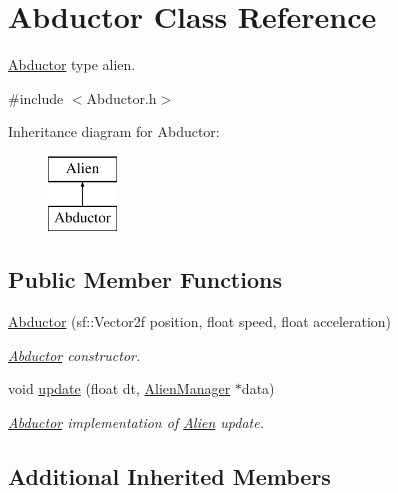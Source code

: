 \hypertarget{class_abductor}{}\section{Abductor Class Reference}
\label{class_abductor}


\hyperlink{class_abductor}{Abductor} type alien.  




{\ttfamily \#include $<$Abductor.\+h$>$}

Inheritance diagram for Abductor\+:\begin{figure}[H]
\begin{center}
\leavevmode
\includegraphics[height=2.000000cm]{class_abductor}
\end{center}
\end{figure}
\subsection*{Public Member Functions}
\begin{DoxyCompactItemize}
\item 
\mbox{\label{class_abductor_a0a0e9c59dbef858db23d11c04fb74276}} 
\hyperlink{class_abductor_a0a0e9c59dbef858db23d11c04fb74276}{Abductor} (sf\+::\+Vector2f position, float speed, float acceleration)
\begin{DoxyCompactList}\small\item\em \hyperlink{class_abductor}{Abductor} constructor. \end{DoxyCompactList}\item 
void \hyperlink{class_abductor_a0a3080d1631319a1bf890cd0f08935a2}{update} (float dt, \hyperlink{class_alien_manager}{Alien\+Manager} $\ast$data)
\begin{DoxyCompactList}\small\item\em \hyperlink{class_abductor}{Abductor} implementation of \hyperlink{class_alien}{Alien} update. \end{DoxyCompactList}\end{DoxyCompactItemize}
\subsection*{Additional Inherited Members}


